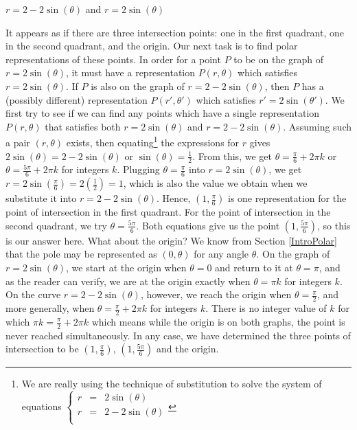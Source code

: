 \begin{ex}
\begin{enumerate}
\begin{center}
$r = 2-2\sin(\theta)$ and \boldmath $r=2\sin(\theta)$

\end{center}

It appears as if there are three intersection points:  one in the first quadrant, one in the second quadrant, and the origin.  Our next task is to find polar representations of these points.  In order for a point $P$ to be on the graph of $r = 2\sin(\theta)$, it must have a representation $P(r,\theta)$ which satisfies $r = 2\sin(\theta)$.  If $P$ is also on the graph of $r = 2 - 2\sin(\theta)$, then $P$ has a (possibly different) representation $P(r',\theta')$ which satisfies $r'=2\sin(\theta')$.   We first try to see if we can find any points which have a single representation $P(r,\theta)$ that satisfies both $r = 2\sin(\theta)$ and $r = 2-2\sin(\theta)$.  Assuming such a pair $(r,\theta)$ exists, then equating\footnote{We are really using the technique of substitution to solve the system of equations  $\left\{ \begin{array}{rcl} r & = & 2\sin(\theta) \\ r & = & 2-2\sin(\theta) \\ \end{array} \right.$} the expressions for $r$ gives $2\sin(\theta) = 2-2\sin(\theta)$ or $\sin(\theta) = \frac{1}{2}$.  From this, we get $\theta = \frac{\pi}{6} + 2\pi k$ or $\theta = \frac{5\pi}{6} + 2\pi k$ for integers $k$.  Plugging $\theta = \frac{\pi}{6}$ into $r = 2\sin(\theta)$, we get $r = 2\sin\left(\frac{\pi}{6}\right) = 2\left(\frac{1}{2}\right) = 1$, which is also the value we obtain when we substitute it into $r = 2-2\sin(\theta)$.  Hence, $\left(1, \frac{\pi}{6}\right)$ is one representation for the point of intersection in the first quadrant. For the point of intersection in the second quadrant, we try $\theta = \frac{5\pi}{6}$. Both equations give us the point $\left(1, \frac{5\pi}{6}\right)$, so this is our answer here.  What about the origin?  We know from Section \ref{IntroPolar} that the pole may be represented as $(0,\theta)$ for any angle $\theta$. On the graph of $r = 2\sin(\theta)$, we start at the origin when $\theta =0$ and return to it at $\theta = \pi$, and as the reader can verify, we are at the origin exactly when $\theta = \pi k$ for integers $k$. On the curve $r = 2 - 2\sin(\theta)$, however, we reach the origin when $\theta = \frac{\pi}{2}$, and more generally, when $\theta = \frac{\pi}{2} + 2\pi k$ for integers $k$.  There is no integer value of $k$ for which $\pi k = \frac{\pi}{2} + 2\pi k$ which means while the origin is on both graphs, the point is never reached simultaneously.  In any case, we have determined the three points of intersection to be $\left(1, \frac{\pi}{6}\right)$, $\left(1,\frac{5\pi}{6}\right)$ and the origin. 


\end{enumerate}
\end{ex}
